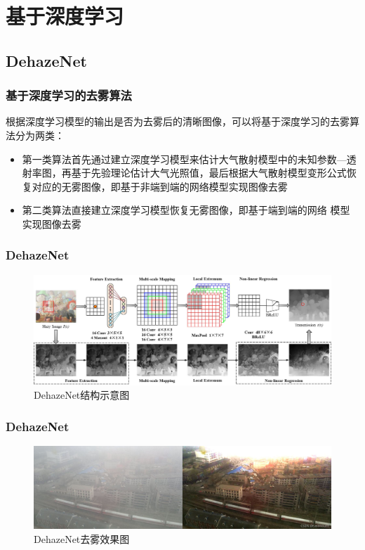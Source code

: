     \section{基于深度学习}
    
    \subsection{DehazeNet}
    \begin{frame}
    \frametitle{基于深度学习的去雾算法}
    根据深度学习模型的输出是否为去雾后的清晰图像，可以将基于深度学习的去雾算法分为两类：
    \begin{itemize}
    \item 第一类算法首先通过建立深度学习模型来估计大气散射模型中的未知参数—透射率图，再基于先验理论估计大气光照值，最后根据大气散射模型变形公式恢复对应的无雾图像，即基于非端到端的网络模型实现图像去雾
    \item 第二类算法直接建立深度学习模型恢复无雾图像，即基于端到端的网络
    模型实现图像去雾
    \end{itemize}
    \end{frame}

    \begin{frame}
      \frametitle{DehazeNet}
      \begin{figure}[h]
        \centering
        \includegraphics[width=\linewidth]{figures/pic10.png}
        \caption{DehazeNet结构示意图}
      \end{figure}
      \end{frame}

    \begin{frame}
      \frametitle{DehazeNet}
      \begin{figure}[h]
        \centering
        \includegraphics[width=\linewidth]{figures/pic12.jpg}
        \caption{DehazeNet去雾效果图}
      \end{figure}
    \end{frame}
  

